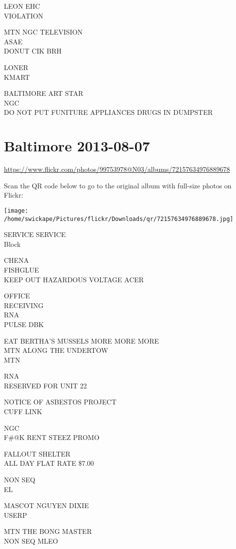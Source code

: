 \documentclass[10pt,letterpaper]{article}
\begin{document}
LEON EHC\\
VIOLATION

MTN NGC TELEVISION\\
ASAE\\
DONUT CIK BRH

LONER\\
KMART

BALTIMORE ART STAR\\
NGC\\
DO NOT PUT FUNITURE APPLIANCES DRUGS IN DUMPSTER


\section*{Baltimore 2013-08-07}

\url{https://www.flickr.com/photos/99753978@N03/albums/72157634976889678}

Scan the QR code below to go to the original album with full-size photos on Flickr:

\texttt{[image: /home/swickape/Pictures/flickr/Downloads/qr/72157634976889678.jpg]}


SERVICE SERVICE\\
Block

CHENA\\
FISHGLUE\\
KEEP OUT HAZARDOUS VOLTAGE ACER

OFFICE\\
RECEIVING\\
RNA\\
PULSE DBK

EAT BERTHA'S MUSSELS MORE MORE MORE\\
MTN ALONG THE UNDERTOW\\
MTN

RNA\\
RESERVED FOR UNIT 22

NOTICE OF ASBESTOS PROJECT\\
CUFF LINK

NGC\\
F\#@K RENT STEEZ PROMO

FALLOUT SHELTER\\
ALL DAY FLAT RATE \$7.00

NON SEQ\\
EL

MASCOT NGUYEN DIXIE\\
USERP

MTN THE BONG MASTER\\
NON SEQ MLEO
\end{document}
